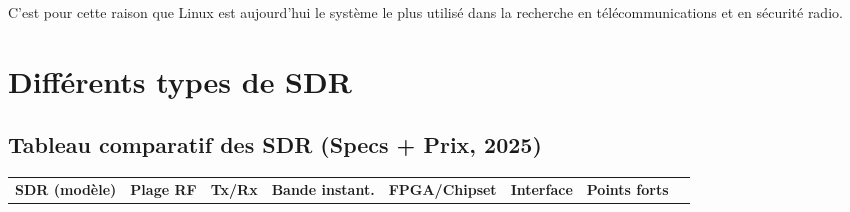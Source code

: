 \documentclass[
  french,
]{article}
\begin{document}
C'est pour cette raison que Linux est aujourd'hui le système le plus
utilisé dans la recherche en télécommunications et en sécurité radio.

\section{Différents types de SDR}\label{diffuxe9rents-types-de-sdr}

\subsection{Tableau comparatif des SDR (Specs + Prix,
2025)}\label{tableau-comparatif-des-sdr-specs-prix-2025}

\begin{longtable}[]{@{}
  >{\raggedright\arraybackslash}p{}
  >{\raggedright\arraybackslash}p{}
  >{\raggedright\arraybackslash}p{}
  >{\raggedright\arraybackslash}p{}
  >{\raggedright\arraybackslash}p{}
  >{\raggedright\arraybackslash}p{}
  >{\raggedright\arraybackslash}p{}
  >{\raggedright\arraybackslash}p{}@{}}
\toprule\noalign{}
\begin{minipage}[b]{\linewidth}\raggedright
\textbf{SDR (modèle)}
\end{minipage} & \begin{minipage}[b]{\linewidth}\raggedright
\textbf{Plage RF}
\end{minipage} & \begin{minipage}[b]{\linewidth}\raggedright
\textbf{Tx/Rx}
\end{minipage} & \begin{minipage}[b]{\linewidth}\raggedright
\textbf{Bande instant.}
\end{minipage} & \begin{minipage}[b]{\linewidth}\raggedright
\textbf{FPGA/Chipset}
\end{minipage} & \begin{minipage}[b]{\linewidth}\raggedright
\textbf{Interface}
\end{minipage} & \begin{minipage}[b]{\linewidth}\raggedright
\textbf{Points forts}
\end{minipage} & \begin{minipage}[b]{\linewidth}\raggedright

\end{minipage}
\end{longtable}
\end{document}
